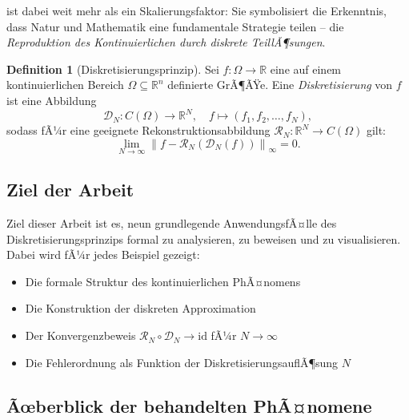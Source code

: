 ﻿\documentclass[a4paper,12pt]{article}
\theoremstyle{definition}
\newtheorem{definition}{Definition}
\begin{document}
ist dabei weit mehr als ein Skalierungsfaktor: Sie symbolisiert die Erkenntnis, dass Natur und Mathematik eine fundamentale Strategie teilen -- die \emph{Reproduktion des Kontinuierlichen durch diskrete TeillÃ¶sungen}.

\begin{definition}[Diskretisierungsprinzip]
    Sei $f : \Omega \to \mathbb{R}$ eine auf einem kontinuierlichen Bereich $\Omega \subseteq \mathbb{R}^n$ definierte GrÃ¶ÃŸe. Eine \emph{Diskretisierung} von $f$ ist eine Abbildung
    \[
    \mathcal{D}_N : C(\Omega) \to \mathbb{R}^N,\quad f \mapsto (f_1, f_2, \ldots, f_N),
    \]
    sodass fÃ¼r eine geeignete Rekonstruktionsabbildung $\mathcal{R}_N : \mathbb{R}^N \to C(\Omega)$ gilt:
    \[
    \lim_{N \to \infty} \left\| f - \mathcal{R}_N(\mathcal{D}_N(f)) \right\|_\infty = 0.
    \]
\end{definition}

\subsection{Ziel der Arbeit}

Ziel dieser Arbeit ist es, neun grundlegende AnwendungsfÃ¤lle des Diskretisierungsprinzips formal zu analysieren, zu beweisen und zu visualisieren. Dabei wird fÃ¼r jedes Beispiel gezeigt:
\begin{itemize}
    \item Die formale Struktur des kontinuierlichen PhÃ¤nomens
    \item Die Konstruktion der diskreten Approximation
    \item Der Konvergenzbeweis $\mathcal{R}_N \circ \mathcal{D}_N \to \mathrm{id}$ fÃ¼r $N \to \infty$
    \item Die Fehlerordnung als Funktion der DiskretisierungsauflÃ¶sung $N$
\end{itemize}

\subsection{Ãœberblick der behandelten PhÃ¤nomene}
\end{document}
